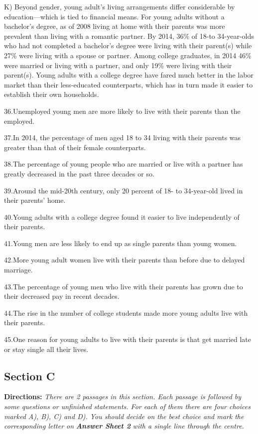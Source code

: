 \documentclass[UTF8,11pt]{ctexart}
\begin{document}
K) Beyond gender, young adult’s living arrangements differ considerable by education—which is tied to financial means. For young adults without a bachelor’s degree, as of 2008 living at home with their parents was more prevalent than living with a romantic partner. By 2014, 36\% of 18-to 34-year-olds who had not completed a bachelor’s degree were living with their parent(s) while 27\% were living with a spouse or partner. Among college graduates, in 2014 46\% were married or living with a partner, and only 19\% were living with their parent(s). Young adults with a college degree have fared much better in the labor market than their less-educated counterparts, which has in turn made it easier to establish their own households.


36.Unemployed young men are more likely to live with their parents than the employed.


37.In 2014, the percentage of men aged 18 to 34 living with their parents was greater than that of their female counterparts.


38.The percentage of young people who are married or live with a partner has greatly decreased in the past three decades or so.


39.Around the mid-20th century, only 20 percent of 18- to 34-year-old lived in their parents’ home.


40.Young adults with a college degree found it easier to live independently of their parents.


41.Young men are less likely to end up as single parents than young women.


42.More young adult women live with their parents than before due to delayed marriage.


43.The percentage of young men who live with their parents has grown due to their decreased pay in recent decades.


44.The rise in the number of college students made more young adults live with their parents.


45.One reason for young adults to live with their parents is that get married late or stay single all their lives.


\subsection*{\textbf{Section C}}


\textbf{Directions:}\textit{ There are 2 passages in this section. Each passage is followed by some questions or unfinished} \textit{statements. For each of them there are four choices marked A), B), C) and D). You should decide on the best} \textit{choice and mark the corresponding letter on}\textbf{\textit{ Answer Sheet 2}}\textit{ with a single line through the centre.}
\end{document}
